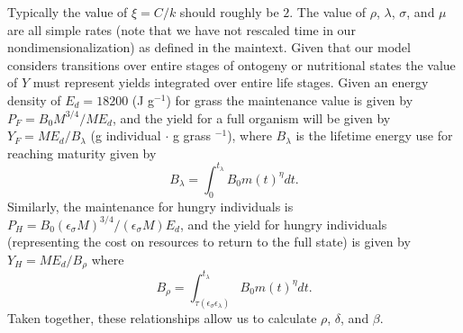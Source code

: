 \documentclass{pnastwo}
\begin{document}
\begin{article}

Typically the value of $\xi=C/k$ should roughly be $2$. The value of $\rho$, $\lambda$, $\sigma$, and $\mu$ are all simple rates (note that we have not rescaled time in our nondimensionalization) as defined in the maintext. Given that our model considers transitions over entire stages of ontogeny or nutritional states the value of $Y$ must represent yields integrated over entire life stages. Given an energy density of $E_{d}=18200$ (J g$^{-1}$) for grass \cite{estermann} the maintenance value is given by $P_{F}=B_{0}M^{3/4}/ME_{d}$, and the yield for a full organism will be given by $Y_{F}=ME_{d}/B_{\lambda}$ (g individual $\cdot$ g grass $^{-1}$), where $B_{\lambda}$ is the lifetime energy use for reaching maturity given by
\begin{equation}
B_{\lambda}=\int_{0}^{t_{\lambda}}B_{0}m\left(t\right)^{\eta}dt.
\end{equation}
Similarly, the maintenance for hungry individuals is $P_{H}=B_{0}(\epsilon_{\sigma}M)^{3/4}/(\epsilon_{\sigma}M)E_{d}$, and the yield for hungry individuals (representing the cost on resources to return to the full state) is given by $Y_{H}=ME_{d}/B_{\rho}$ where
\begin{equation}
B_{\rho}=\int_{\tau\left(\epsilon_{\sigma}\epsilon_{\lambda}\right)}^{t_{\lambda}}B_{0}m\left(t\right)^{\eta}dt.
\end{equation}
Taken together, these relationships allow us to calculate $\rho$, $\delta$, and $\beta$.


\end{article}
\end{document}
